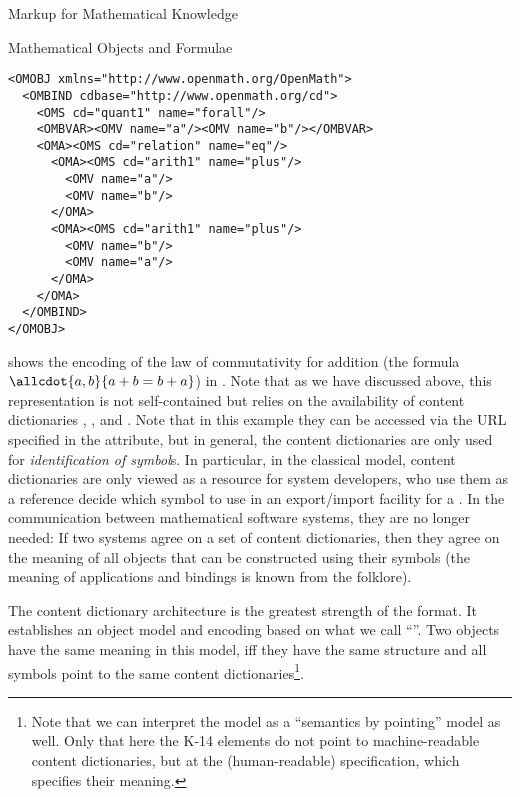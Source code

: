\begin{omgroup}[id=math-markup]{Markup for Mathematical Knowledge}
\begin{omgroup}[id=math-objects]{Mathematical Objects and Formulae}
\begin{omgroup}[id=math-markup:openmath]{\openmath}
\begin{lstlisting}[label=lst:om-comm,
    caption={{\openmath} Representation of $\allcdot{a,b}{a+b=b+a}$},
    language=OpenMath,
    index={OMOBJ,OMBIND,OMS,OMBVAR,OMV,OMATTR,OMATP}]
<OMOBJ xmlns="http://www.openmath.org/OpenMath">                            
  <OMBIND cdbase="http://www.openmath.org/cd">                          
    <OMS cd="quant1" name="forall"/> 
    <OMBVAR><OMV name="a"/><OMV name="b"/></OMBVAR>                        
    <OMA><OMS cd="relation" name="eq"/> 
      <OMA><OMS cd="arith1" name="plus"/>
        <OMV name="a"/>               
        <OMV name="b"/>               
      </OMA>                         
      <OMA><OMS cd="arith1" name="plus"/>
        <OMV name="b"/>               
        <OMV name="a"/>               
      </OMA>      
    </OMA>                           
  </OMBIND>                         
</OMOBJ>
\end{lstlisting}
  {} shows the {\xml} encoding of the law of commutativity for addition
  (the formula $\allcdot{a,b}{a+b=b+a}$) in {\openmath}. Note that as we have discussed
  above, this representation is not self-contained but relies on the availability of
  content dictionaries {},
  {}, and {}. Note that in this example they can be
  accessed via the URL specified in the {} attribute,
  but in general, the content dictionaries are only used for {\emph{identification of
      symbol}s}. In particular, in the classical {\openmath} model, content dictionaries
  are only viewed as a resource for system developers, who use them as a reference decide
  which symbol to use in an export/import facility for a {}. In the communication between mathematical software systems, they
  are no longer needed: If two systems agree on a set of content dictionaries, then they
  agree on the meaning of all {\openmath} objects that can be constructed using their
  symbols (the meaning of applications and bindings is known from the folklore).

  The content dictionary architecture is the greatest strength of the {\openmath}
  format. It establishes an object model and {\xml} encoding based on what we call
  ``''. Two {\openmath} objects have the same meaning in
  this model, iff they have the same structure and all symbols point to the same content
  dictionaries\footnote{Note that we can interpret the {\cmathml} model as a ``semantics
    by pointing'' model as well. Only that here the K-14 elements do not point to
    machine-readable content dictionaries, but at the (human-readable) {\mathml}
    specification, which specifies their meaning.}.


\end{omgroup}
\end{omgroup}
\end{omgroup}
